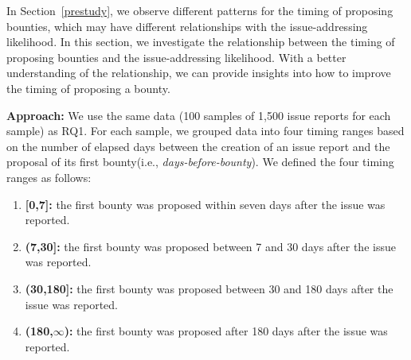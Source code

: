 
In Section~\ref{prestudy}, we observe different patterns for the timing of proposing bounties, which may have different relationships with the issue-addressing likelihood. In this section, we investigate the relationship between the timing of proposing bounties and the issue-addressing likelihood. With a better understanding of the relationship, we can provide insights into how to improve the timing of proposing a bounty.

\textbf{Approach:}
We use the same data (100 samples of 1,500 issue reports for each sample) as RQ1. For each sample, we grouped data into four timing ranges based on the number of elapsed days between the creation of an issue report and the proposal of its first bounty(i.e., \textit{days-before-bounty}). We defined the four timing ranges as follows:
\begin{enumerate}
    \item \textbf{[0,7]:} the first bounty was proposed within seven days after the issue was reported.
    \item \textbf{(7,30]:} the first bounty was proposed between 7 and 30 days after the issue was reported.
    \item \textbf{(30,180]:} the first bounty was proposed between 30 and 180 days after the issue was reported.
    \item \textbf{(180,$\infty$):} the first bounty was proposed after 180 days after the issue was reported.
\end{enumerate}

